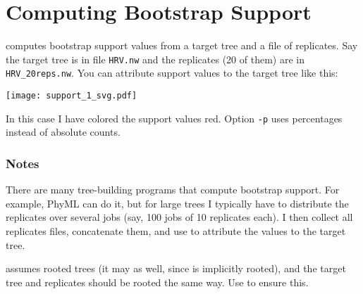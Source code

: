 \section{Computing Bootstrap Support}

\support{} computes bootstrap support values from a target tree and a file of
replicates. Say the target tree is in file \texttt{HRV.nw} and the replicates
(20 of them) are in \texttt{HRV\_20reps.nw}. You can attribute support values
to the target tree like this:


\texttt{[image: support\_1\_svg.pdf]}

In this case I have colored the support values red. Option \texttt{-p} uses
percentages instead of absolute counts.

\subsubsection{Notes}

There are many tree-building programs that compute bootstrap support. For
example, PhyML can do it, but for large trees I typically have to distribute
the replicates over several jobs (say, 100 jobs of 10 replicates each). I then
collect all replicates files, concatenate them, and use \support{} to attribute
the values to the target tree.

\support{} assumes rooted trees (it may as well, since \nw{} is implicitly
rooted), and the target tree and replicates should be rooted the same way. Use
\reroot{} to ensure this.
